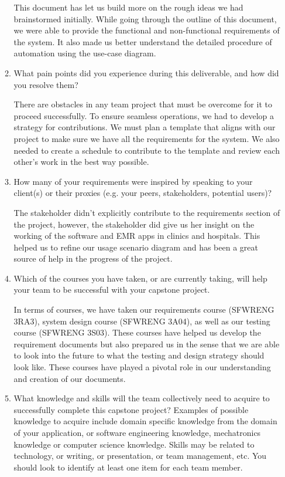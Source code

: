 \documentclass[12pt]{article}
\begin{document}
\begin{itemize}
\begin{enumerate}
  This document has let us build more on the rough ideas we had brainstormed initially. While going through the outline of this document, we were able to provide the functional and non-functional requirements of the system. It also made us better understand the detailed procedure of automation using the use-case diagram. 

  \item What pain points did you experience during this deliverable, and how did
  you resolve them?

  There are obstacles in any team project that must be overcome for it to proceed successfully. To ensure seamless operations, we had to develop a strategy for contributions. We must plan a template that aligns with our project to make sure we have all the requirements for the system. We also needed to create a schedule to contribute to the template and review each other's work in the best way possible.
  
  \item How many of your requirements were inspired by speaking to your
  client(s) or their proxies (e.g. your peers, stakeholders, potential users)?

  The stakeholder didn't explicitly contribute to the requirements section of the project, however, the stakeholder did give us her insight on the working of the software and EMR apps in clinics and hospitals. This helped us to refine our usage scenario diagram and has been a great source of help in the progress of the project.

  \item Which of the courses you have taken, or are currently taking, will help
  your team to be successful with your capstone project.

  In terms of courses, we have taken our requirements course (SFWRENG 3RA3), system design course (SFWRENG 3A04), as well as our testing course (SFWRENG 3S03). These courses have helped us develop the requirement documents but also prepared us in the sense that we are able to look into the future to what the testing and design strategy should look like. These courses have played a pivotal role in our understanding and creation of our documents. 

  \item What knowledge and skills will the team collectively need to acquire to
  successfully complete this capstone project?  Examples of possible knowledge
  to acquire include domain specific knowledge from the domain of your
  application, or software engineering knowledge, mechatronics knowledge or
  computer science knowledge.  Skills may be related to technology, or writing,
  or presentation, or team management, etc.  You should look to identify at
  least one item for each team member.


\end{enumerate}
\end{itemize}
\end{document}
